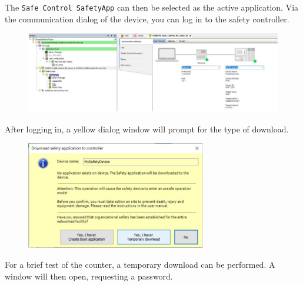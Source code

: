 \documentclass[a4paper,12pt]{article}
\begin{document}
The \texttt{Safe Control SafetyApp} can then be selected as the active application. Via the communication dialog of the device, you can log in to the safety controller.
\begin{figure}[H]
	\centering
	\includegraphics[width=1\textwidth]{e8.JPG}
\end{figure}
After logging in, a yellow dialog window will prompt for the type of download.
\begin{figure}[H]
	\centering
	\includegraphics[width=0.7\textwidth]{e9.JPG}
\end{figure}
For a brief test of the counter, a temporary download can be performed. A window will then open, requesting a password.
\end{document}

